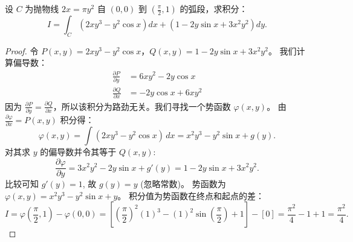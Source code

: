 \documentclass[lang=cn,10pt,thmcnt=section]{elegantbook}
\begin{document}
\begin{example}
    设 $C$ 为抛物线 $2x = \pi y^2$ 自 $(0, 0)$ 到 $\left( \frac{\pi}{2}, 1 \right)$ 的弧段，求积分：
\[
I = \int_{C} \left( 2xy^3 - y^2 \cos x \right) dx + \left( 1 - 2y \sin x + 3x^2 y^2 \right) dy.
\]
\end{example}
\begin{proof}
    令 $P(x, y) = 2xy^3 - y^2 \cos x$，$Q(x, y) = 1 - 2y \sin x + 3x^2 y^2$。
    我们计算偏导数：
    \begin{align*}
    \frac{\partial P}{\partial y} &= 6xy^2 - 2y \cos x \\
    \frac{\partial Q}{\partial x} &= -2y \cos x + 6xy^2
    \end{align*}
    因为 $\frac{\partial P}{\partial y} = \frac{\partial Q}{\partial x}$，所以该积分为路劲无关。我们寻找一个势函数 $\varphi(x, y)$。
    由 $\frac{\partial \varphi}{\partial x} = P(x, y)$ 积分得：
    \[
    \varphi(x, y) = \int (2xy^3 - y^2 \cos x) \, dx = x^2 y^3 - y^2 \sin x + g(y).
    \]
    对其求 $y$ 的偏导数并令其等于 $Q(x, y)$:
    \[
    \frac{\partial \varphi}{\partial y} = 3x^2 y^2 - 2y \sin x + g'(y) = 1 - 2y \sin x + 3x^2 y^2.
    \]
    比较可知 $g'(y) = 1$, 故 $g(y) = y$ (忽略常数)。
    势函数为 $\varphi(x, y) = x^2 y^3 - y^2 \sin x + y$。
    积分值为势函数在终点和起点的差：
    \[
    I = \varphi\left(\frac{\pi}{2}, 1\right) - \varphi(0, 0) = \left[ \left(\frac{\pi}{2}\right)^2(1)^3 - (1)^2 \sin\left(\frac{\pi}{2}\right) + 1 \right] - [0] = \frac{\pi^2}{4} - 1 + 1 = \frac{\pi^2}{4}.
    \]
\end{proof}
\end{document}
